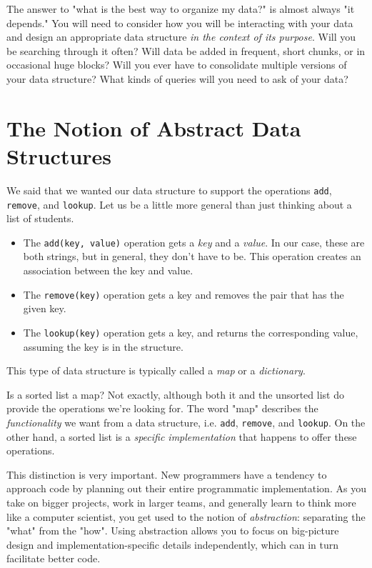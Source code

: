 The answer to "what is the best way to organize my data?" is almost always "it depends."
You will need to consider how you will be interacting with your data and design an appropriate data structure \emph{in the context of its purpose}. 
Will you be searching through it often?
Will data be added in frequent, short chunks, or in occasional huge blocks?
Will you ever have to consolidate multiple versions of your data structure?
What kinds of queries will you need to ask of your data?

\section{The Notion of Abstract Data Structures}

We said that we wanted our data structure to support the operations \texttt{add}, \texttt{remove}, and \texttt{lookup}.
Let us be a little more general than just thinking about a list of students.

\begin{itemize}
\item The \texttt{add(key, value)} operation gets a \emph{key} and a \emph{value}.
In our case, these are both strings, but in general, they don't have to be.
This operation creates an association between the key and value.
\item The \texttt{remove(key)} operation gets a key and removes the pair that has the given key.
\item The \texttt{lookup(key)} operation gets a key, and returns the corresponding value, assuming the key is in the structure.
\end{itemize}

This type of data structure is typically called a \emph{map} or a \emph{dictionary}.

Is a sorted list a map?
Not exactly, although both it and the unsorted list do provide the operations we're looking for.
The word "map" describes the \emph{functionality} we want from a data structure, i.e. \texttt{add}, \texttt{remove}, and \texttt{lookup}.
On the other hand, a sorted list is a \emph{specific implementation} that happens to offer these operations.

This distinction is very important.
New programmers have a tendency to approach code by planning out their entire programmatic implementation.
As you take on bigger projects, work in larger teams, and generally learn to think more like a computer scientist, you get used to the notion of \emph{abstraction}: separating the "what" from the "how".
Using abstraction allows you to focus on big-picture design and implementation-specific details independently, which can in turn facilitate better code.


